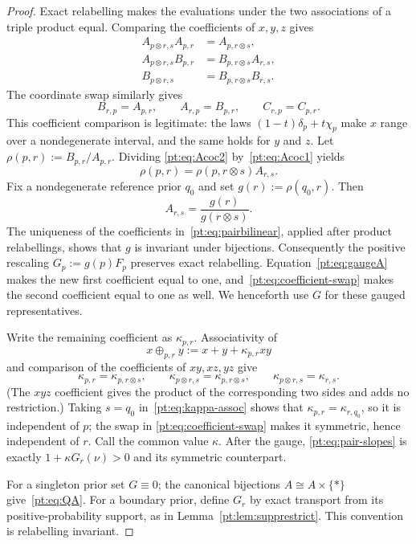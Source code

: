 \begin{proof}
Exact relabelling makes the evaluations under the two associations of a
triple product equal.  Comparing the coefficients of $x,y,z$ gives
\begin{align}
 A_{p\otimes r,s}A_{p,r}&=A_{p,r\otimes s},\label{pt:eq:Acoc1}\\
 A_{p\otimes r,s}B_{p,r}&=B_{p,r\otimes s}A_{r,s},\label{pt:eq:Acoc2}\\
 B_{p\otimes r,s}&=B_{p,r\otimes s}B_{r,s}.
\label{pt:eq:Acoc3}
\end{align}
The coordinate swap similarly gives
\[
 B_{r,p}=A_{p,r},\qquad A_{r,p}=B_{p,r},\qquad C_{r,p}=C_{p,r}.
\tag{SW}\label{pt:eq:coefficient-swap}
\]
This coefficient comparison is legitimate: the laws
$(1-t)\delta_p+t\chi_p$ make $x$ range over a nondegenerate interval, and
the same holds for $y$ and $z$.
Let $\rho(p,r):=B_{p,r}/A_{p,r}$.  Dividing
\eqref{pt:eq:Acoc2} by~\eqref{pt:eq:Acoc1} yields
\[
 \rho(p,r)=\rho(p,r\otimes s)A_{r,s}.
\]
Fix a nondegenerate reference prior $q_0$ and set
$g(r):=\rho(q_0,r)$.  Then
\begin{equation}
 A_{r,s}=\frac{g(r)}{g(r\otimes s)}.
\label{pt:eq:gaugeA}
\end{equation}
The uniqueness of the coefficients in~\eqref{pt:eq:pairbilinear}, applied
after product relabellings, shows that $g$ is invariant under bijections.
Consequently the positive rescaling $G_p:=g(p)F_p$ preserves exact
relabelling.  Equation~\eqref{pt:eq:gaugeA} makes the new first coefficient
equal to one, and~\eqref{pt:eq:coefficient-swap} makes the second coefficient
equal to one as well.  We henceforth use $G$ for these gauged representatives.

Write the remaining coefficient as $\kappa_{p,r}$.  Associativity of
\[
 x\oplus_{p,r}y:=x+y+\kappa_{p,r}xy
\]
and comparison of the coefficients of $xy,xz,yz$ give
\[
 \kappa_{p,r}=\kappa_{p,r\otimes s},\qquad
 \kappa_{p\otimes r,s}=\kappa_{p,r\otimes s},\qquad
 \kappa_{p\otimes r,s}=\kappa_{r,s}.
\tag{KA}\label{pt:eq:kappa-assoc}
\]
(The $xyz$ coefficient gives the product of the corresponding two sides and
adds no restriction.)  Taking $s=q_0$ in~\eqref{pt:eq:kappa-assoc} shows that
$\kappa_{p,r}=\kappa_{r,q_0}$, so it is independent of $p$; the swap in
\eqref{pt:eq:coefficient-swap} makes it symmetric, hence independent of $r$.
Call the common value $\kappa$.  After the gauge,
\eqref{pt:eq:pair-slopes} is exactly
$1+\kappa G_r(\nu)>0$ and its symmetric counterpart.

For a singleton prior set $G\equiv0$; the canonical bijections
$A\cong A\times\{*\}$ give~\eqref{pt:eq:QA}.  For a boundary prior, define
$G_r$ by exact transport from its positive-probability support, as in
Lemma~\ref{pt:lem:supprestrict}.  This convention is relabelling invariant.
\end{proof}

